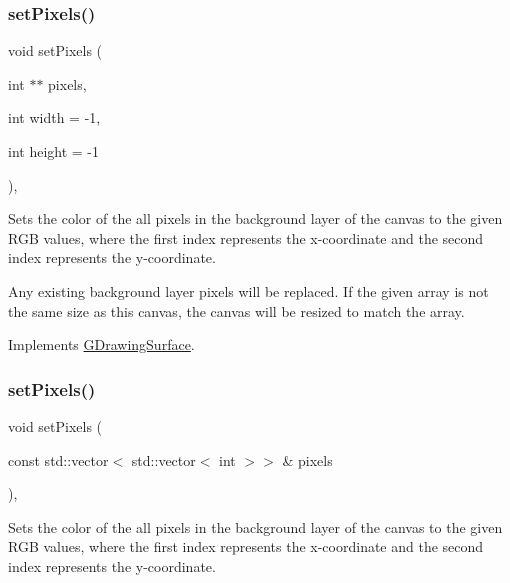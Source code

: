 \subsubsection{\texorpdfstring{set\+Pixels()}{setPixels()}\hspace{0.1cm}{\footnotesize\ttfamily [1/2]}}
{\footnotesize\ttfamily void set\+Pixels (\begin{DoxyParamCaption}\item[{int $\ast$$\ast$}]{pixels,  }\item[{int}]{width = {\ttfamily -\/1},  }\item[{int}]{height = {\ttfamily -\/1} }\end{DoxyParamCaption})\hspace{0.3cm}{\ttfamily [override]}, {\ttfamily [virtual]}}



Sets the color of the all pixels in the background layer of the canvas to the given R\+GB values, where the first index represents the x-\/coordinate and the second index represents the y-\/coordinate. 

Any existing background layer pixels will be replaced. If the given array is not the same size as this canvas, the canvas will be resized to match the array. 

Implements \mbox{\hyperlink{classsgl_1_1GDrawingSurface_a7771c343e50fbc67cb309755840e512d}{G\+Drawing\+Surface}}.

\mbox{\label{classsgl_1_1GCanvas_afa5e481700ddb87860c4efd815db9ab2}} 
\subsubsection{\texorpdfstring{set\+Pixels()}{setPixels()}\hspace{0.1cm}{\footnotesize\ttfamily [2/2]}}
{\footnotesize\ttfamily void set\+Pixels (\begin{DoxyParamCaption}\item[{const std\+::vector$<$ std\+::vector$<$ int $>$$>$ \&}]{pixels }\end{DoxyParamCaption})\hspace{0.3cm}{\ttfamily [override]}, {\ttfamily [virtual]}}



Sets the color of the all pixels in the background layer of the canvas to the given R\+GB values, where the first index represents the x-\/coordinate and the second index represents the y-\/coordinate. 

